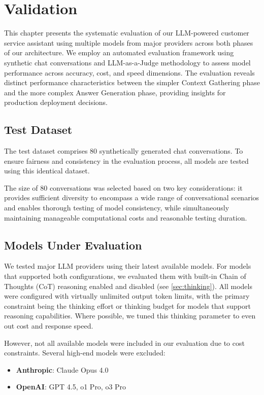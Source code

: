 \chapter{Validation}
\label{cha:validation}

This chapter presents the systematic evaluation of our LLM-powered customer service assistant using multiple models from major providers across both phases of our architecture.
We employ an automated evaluation framework using synthetic chat conversations and LLM-as-a-Judge methodology to assess model performance across accuracy, cost, and speed dimensions.
The evaluation reveals distinct performance characteristics between the simpler Context Gathering phase and the more complex Answer Generation phase, providing insights for production deployment decisions.

\section{Test Dataset}

The test dataset comprises 80 synthetically generated chat conversations.
To ensure fairness and consistency in the evaluation process, all models are tested using this identical dataset.

The size of 80 conversations was selected based on two key considerations: it provides sufficient diversity to encompass a wide range of conversational scenarios and enables thorough testing of model consistency, while simultaneously maintaining manageable computational costs and reasonable testing duration.

\section{Models Under Evaluation}

We tested major LLM providers using their latest available models.
For models that supported both configurations, we evaluated them with built-in Chain of Thoughts (CoT) reasoning enabled and disabled (see \cref{sec:thinking}).
All models were configured with virtually unlimited output token limits, with the primary constraint being the thinking effort or thinking budget for models that support reasoning capabilities.
Where possible, we tuned this thinking parameter to even out cost and response speed.

However, not all available models were included in our evaluation due to cost constraints. Several high-end models were excluded:
\begin{itemize}
    \item \textbf{Anthropic}: Claude Opus 4.0 \cite{anthropic_pricing}
    \item \textbf{OpenAI}: GPT 4.5, o1 Pro, o3 Pro \cite{openai_pricing}
\end{itemize}

